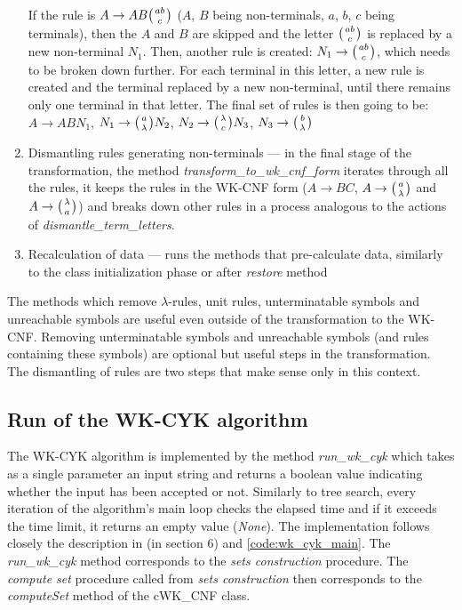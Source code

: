 \begin{enumerate}
{  If the rule is $A \rightarrow A B \wkpair{ab}{c}$ ($A$, $B$ being non-terminals, $a$, $b$, $c$ being terminals), then the $A$ and $B$ are skipped and the letter $\wkpair{ab}{c}$ is replaced by a new non-terminal $N_1$. Then, another rule is created: $N_1 \rightarrow \wkpair{ab}{c}$, which needs to be broken down further. For each terminal in this letter, a new rule is created and the terminal replaced by a new non-terminal, until there remains only one terminal in that letter. The final set of rules is then going to be: $A \rightarrow A B N_1$, $N_1 \rightarrow \wkpair{a}{\lambda} N_2$, $N_2 \rightarrow \wkpair{\lambda}{c} N_3$, $N_3 \rightarrow \wkpair{b}{\lambda}$}

  \item{Dismantling rules generating non-terminals --- in the final stage of the transformation, the method \textit{transform\_to\_wk\_cnf\_form} iterates through all the rules, it keeps the rules in the WK-CNF form ($A \rightarrow BC$, $A \rightarrow \wkpair{a}{\lambda}$ and $A \rightarrow \wkpair{\lambda}{a}$) and breaks down other rules in a process analogous to the actions of \textit{dismantle\_term\_letters}}.

  \item{Recalculation of data --- runs the methods that pre-calculate data, similarly to the class initialization phase or after \textit{restore} method}
\end{enumerate}

The methods which remove $\lambda$-rules, unit rules, unterminatable symbols and unreachable symbols are useful even outside of the transformation to the WK-CNF. Removing unterminatable symbols and unreachable symbols (and rules containing these symbols) are optional but useful steps in the transformation. The dismantling of rules are two steps that make sense only in this context.


\subsection{Run of the WK-CYK algorithm}
The WK-CYK algorithm is implemented by the method \textit{run\_wk\_cyk} which takes as a single parameter an input string and returns a boolean value indicating whether the input has been accepted or not. Similarly to tree search, every iteration of the algorithm's main loop checks the elapsed time and if it exceeds the time limit, it returns an empty value (\textit{None}). The implementation follows closely the description in \cite{WK_CYK} (in section 6) and \ref{code:wk_cyk_main}. The \textit{run\_wk\_cyk} method corresponds to the \textit{sets construction} procedure. The \textit{compute set} procedure called from \textit{sets construction} then corresponds to the \textit{computeSet} method of the cWK\_CNF class.


